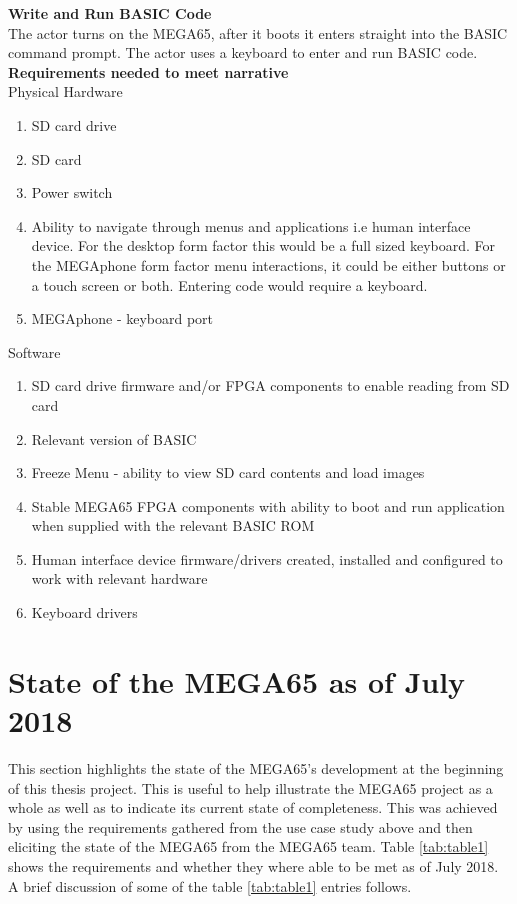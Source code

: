 \textbf{Write and Run BASIC Code}\\
The actor turns on the MEGA65, after it boots it enters straight into the BASIC command prompt. The actor uses a keyboard to enter and run BASIC code. \\

\textbf{Requirements needed to meet narrative}\\
Physical Hardware
\begin{enumerate}
\item SD card drive
\item SD card
\item Power switch
\item Ability to navigate through menus and applications i.e human interface device. For the desktop form factor this would be a full sized keyboard. For the MEGAphone form factor menu interactions, it could be either buttons or a touch screen or both. Entering code would require a keyboard.
\item MEGAphone - keyboard port
\end{enumerate}

Software\\
\begin{enumerate}
\item SD card drive firmware and/or FPGA components to enable reading from SD card
\item Relevant version of BASIC 
\item Freeze Menu - ability to view SD card contents and load images
\item Stable MEGA65 FPGA components with ability to boot and run application when supplied with the relevant BASIC ROM
\item Human interface device firmware/drivers created, installed and configured to work with relevant hardware
\item Keyboard drivers
\end{enumerate}

\section{State of the MEGA65 as of July 2018}
This section highlights the state of the MEGA65's development at the beginning of this thesis project. This is useful to help illustrate the MEGA65 project as a whole as well as to indicate its current state of completeness. This was achieved by using the requirements gathered from the use case study above and then eliciting the state of the MEGA65 from the MEGA65 team. Table \ref{tab:table1} shows the requirements and whether they where able to be met as of July 2018. A brief discussion of some of the table \ref{tab:table1} entries follows. 

